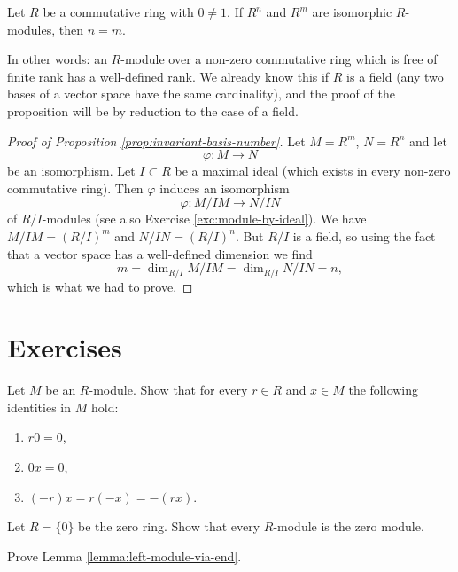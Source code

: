 \begin{proposition}\label{prop:invariant-basis-number}
Let $R$ be a commutative ring with $0\neq 1$. If $R^n$ and $R^m$ are isomorphic $R$-modules, then $n=m$.
\end{proposition}

In other words: an $R$-module over a non-zero commutative ring which is free of finite rank has a well-defined rank. We already know this if $R$ is a field (any two bases of a vector space have the same cardinality), and the proof of the proposition will be by reduction to the case of a field.

\begin{proof}[Proof of Proposition \ref{prop:invariant-basis-number}]
Let $M=R^m$, $N=R^n$ and let
\[
	\varphi\colon M \to N
\]
be an isomorphism. Let $I \subset R$ be a maximal ideal (which exists in every non-zero commutative ring). Then $\varphi$ induces an isomorphism
\[
	\bar\varphi\colon M/IM \to N/IN
\]
of $R/I$-modules (see also Exercise \ref{exc:module-by-ideal}). We have $M/IM = (R/I)^m$ and $N/IN = (R/I)^n$. But $R/I$ is a field, so using
the fact that a vector space has a well-defined dimension we find
\[
	m = \dim_{R/I} M/IM = \dim_{R/I} N/IN = n,
\]
which is what we had to prove.
\end{proof}

\newpage
\section*{Exercises}


\begin{exercise}\label{exc:zeroes}
Let $M$ be an $R$-module. Show that for every $r\in R$ and $x\in M$ the following identities in $M$ hold:
\begin{enumerate}
\item $r0=0$,
\item $0x=0$,
\item  $(-r)x=r(-x)=-(rx)$.
\end{enumerate}
\end{exercise}

\begin{exercise}
Let $R = \{0\}$ be the zero ring. Show that every $R$-module is the zero module.
\end{exercise}

\begin{exercise}\label{exc:left-module-via-end}
Prove Lemma \ref{lemma:left-module-via-end}.
\end{exercise}


